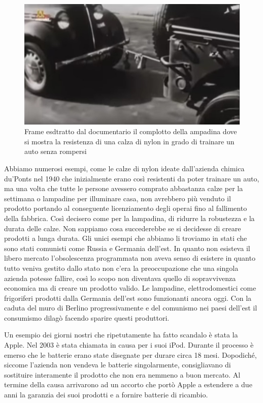 \documentclass[12pt]{book} %
\begin{document}
\begin{figure}
  \centering
  \includegraphics[width=0.95\linewidth]{images/Libro-img052.jpg}
  \begin{minipage}{\linewidth}
    \caption{Frame esdtratto dal documentario {\textquotedbl}il
complotto della ampadina{\textquotedbl} dove si mostra la resistenza di una calza di nylon in grado di trainare un auto
senza rompersi}
  \end{minipage}
\end{figure}

Abbiamo numerosi esempi, come le calze di nylon ideate dall'azienda chimica du'Ponts nel 1940 che
inizialmente erano così resistenti da poter trainare un auto, ma una volta che tutte le persone avessero comprato
abbastanza calze per la settimana o lampadine per illuminare casa, non avrebbero più venduto il prodotto portando al
conseguente licenziamento degli operai fino al fallimento della fabbrica. Così decisero come per la lampadina, di
ridurre la robustezza e la durata delle calze. Non sappiamo cosa succederebbe se si decidesse di creare prodotti a
lunga durata. Gli unici esempi che abbiamo li troviamo in stati che sono stati comunisti come Russia e Germania
dell'est. In quanto non esisteva il libero mercato l'obsolescenza programmata
non aveva senso di esistere in quanto tutto veniva gestito dallo stato non c'era la preoccupazione
che una singola azienda potesse fallire, così lo scopo non diventava quello di sopravvivenza economica ma di creare un
prodotto valido. Le lampadine, elettrodomestici come frigoriferi prodotti dalla Germania dell'est
sono funzionanti ancora oggi. Con la caduta del muro di Berlino progressivamente e del comunismo nei paesi
dell'est il consumismo dilagò facendo sparire questi produttori.

Un esempio dei giorni nostri che ripetutamente ha fatto scandalo è stata la Apple. Nel 2003 è stata chiamata in causa
per i suoi iPod. Durante il processo è emerso che le batterie erano state disegnate per durare circa 18 mesi.
Dopodiché, siccome l'azienda non vendeva le batterie singolarmente, consigliavano di sostituire
interamente il prodotto che non era nemmeno a buon mercato. Al termine della causa arrivarono ad un accorto che portò
Apple a estendere a due anni la garanzia dei suoi prodotti e a fornire batterie di ricambio.
\end{document}
